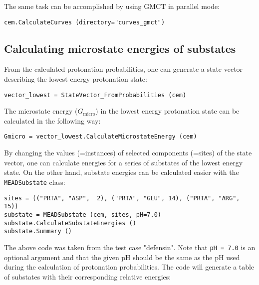 \documentclass[a4paper,11pt]{article}
\begin{document}
{\bigskip
The same task can be accomplished by using GMCT in parallel mode:

{\footnotesize \begin{lstlisting}
cem.CalculateCurves (directory="curves_gmct")
\end{lstlisting} }


\subsection{Calculating microstate energies of substates}
From the calculated protonation probabilities, one can generate a state vector describing
the lowest energy protonation state:

{\footnotesize \begin{lstlisting}
vector_lowest = StateVector_FromProbabilities (cem)
\end{lstlisting} }

\bigskip
The microstate energy ($G_{\mathrm{micro}}$) in the lowest energy protonation state can 
be calculated in the following way:

{\footnotesize \begin{lstlisting}
Gmicro = vector_lowest.CalculateMicrostateEnergy (cem)
\end{lstlisting} }

\bigskip
By changing the values (=instances) of selected components (=sites) of the state vector, 
one can calculate energies for a series of substates of the lowest energy state.
%
On the other hand, substate energies can be calculated easier with the \texttt{MEADSubstate} class:

{\footnotesize \begin{lstlisting}
sites = (("PRTA", "ASP",  2), ("PRTA", "GLU", 14), ("PRTA", "ARG", 15))
substate = MEADSubstate (cem, sites, pH=7.0)
substate.CalculateSubstateEnergies ()
substate.Summary ()
\end{lstlisting} }

\bigskip
The above code was taken from the test case "defensin".
%
Note that \texttt{pH = 7.0} is an optional argument and that the given pH should be the same
as the pH used during the calculation of protonation probabilities.
%
The code will generate a table of substates with their corresponding relative energies:

}
\end{document}
